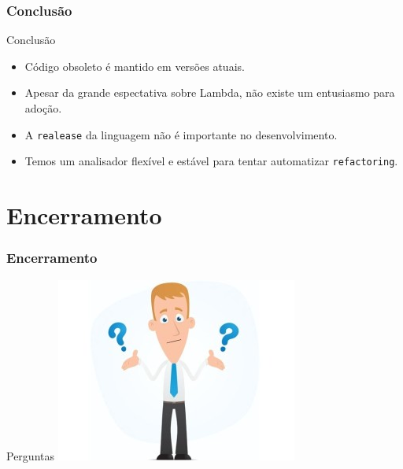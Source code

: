 \documentclass[]{beamer}
\begin{document}

	\begin{frame}[fragile, label=re]\frametitle{Conclusão}
		\begin{block}{Conclusão}
			\begin{itemize}
				\item Código obsoleto é mantido em versões atuais.
				\item Apesar da grande espectativa sobre Lambda, não existe um entusiasmo para adoção.
				\item A \texttt{realease} da linguagem não é importante no desenvolvimento.
				\item Temos um analisador flexível e estável para tentar automatizar \texttt{refactoring}.
			\end{itemize}
			
		\end{block}
	\end{frame}	


	\section{Encerramento}
	\begin{frame}[label=encerramento]
		\frametitle{Encerramento}
		\begin{block}{Perguntas}
			\centering
			\includegraphics[scale=0.6]{duvidas.jpg}\\
		\end{block}
	\end{frame}
\end{document}
